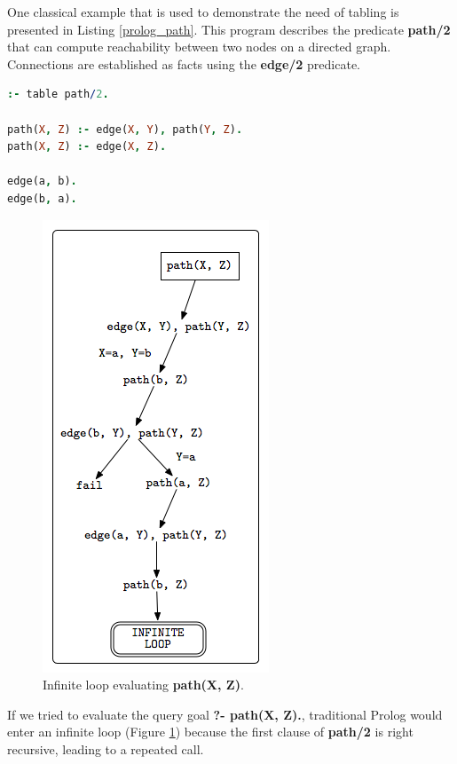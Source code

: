 One classical example that is used to demonstrate the need of tabling is presented in Listing \ref{prolog_path}.
This program describes the predicate \textbf{path/2} that can compute reachability between two nodes on a directed graph.
Connections are established as facts using the \textbf{edge/2} predicate.

\begin{lstlisting}[language=prolog,basicstyle=\footnotesize,float,frame=single,caption={\textit{path} program.},label=prolog_path]
:- table path/2.

path(X, Z) :- edge(X, Y), path(Y, Z).
path(X, Z) :- edge(X, Z).

edge(a, b).
edge(b, a).
\end{lstlisting}

\begin{figure}[ht]
  \centering
    \includegraphics[scale=0.5]{infinite_loop.png}
  \caption{Infinite loop evaluating \textbf{path(X, Z)}.}
  \label{fig:infinite_loop}
\end{figure}

If we tried to evaluate the query goal \textbf{?- path(X, Z).}, traditional Prolog would enter an infinite loop (Figure \ref{fig:infinite_loop})
because the first clause of \textbf{path/2} is right recursive, leading to a repeated call.

